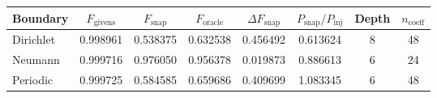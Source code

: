 \begin{tabular}{lccccccc}
\toprule
Boundary & $F_{\mathrm{givens}}$ & $F_{\mathrm{snap}}$ & $F_{\mathrm{oracle}}$ & $\Delta F_{\mathrm{snap}}$ & $P_{\mathrm{snap}} / P_{\mathrm{inj}}$ & Depth & $n_{\mathrm{coeff}}$ \\
\midrule
Dirichlet & 0.998961 & 0.538375 & 0.632538 & 0.456492 & 0.613624 & 8 & 48 \\
Neumann & 0.999716 & 0.976050 & 0.956378 & 0.019873 & 0.886613 & 6 & 24 \\
Periodic & 0.999725 & 0.584585 & 0.659686 & 0.409699 & 1.083345 & 6 & 48 \\
\bottomrule
\end{tabular}
